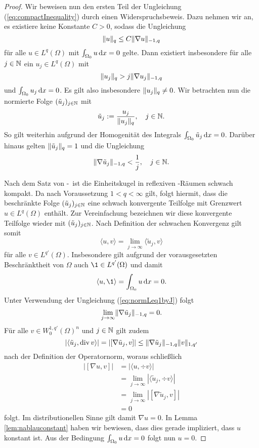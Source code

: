 \begin{proof}
  Wir beweisen nun den ersten Teil der Ungleichung (\ref{eq:compactInequality}) durch einen Widerspruchsbeweis.
  Dazu nehmen wir an, es existiere keine Konstante $C > 0$, sodass die Ungleichung
  $$
  \lVert u \rVert_q \leq C \lVert \nabla u \rVert_{-1,q}
  $$
  für alle $u \in L^q(\Omega)$ mit $\int_{\Omega_0} u \, {\operatorname{d}\!{x}} = 0$ gelte.
  Dann existiert insbesondere für alle $j \in \mathbb{N}$ ein $u_j \in L^q(\Omega)$ mit
  $$
  \lVert u_j \rVert_q > j \lVert \nabla u_j \rVert_{-1,q}
  $$
  und $\int_{\Omega_0} u_j \, {\operatorname{d}\!{x}} = 0$.
  Es gilt also insbesondere $\lVert u_j \rVert_q \neq 0$.
  Wir betrachten nun die normierte Folge $(\tilde u_j)_{j \in \mathbb{N}}$ mit 
  $$
  \tilde u_j := \frac{u_j}{\lVert u_j \rVert_{q}}, \quad j \in \mathbb{N}.
  $$
  So gilt weiterhin aufgrund der Homogenität des Integrals $\int_{\Omega_0} \tilde u_j \, {\operatorname{d}\!{x}} = 0$. 
  Darüber hinaus gelten $\lVert \tilde u_j \rVert_q = 1$ und die Ungleichung 
  \begin{equation}
    \label{eq:normLeq1byJ}
    \lVert \nabla \tilde u_j \rVert_{-1,q} < \frac{1}{j}, \quad j \in \mathbb{N}.
  \end{equation}

  Nach dem Satz von \banach\hyp{}\alaoglu\ ist die Einheitskugel in reflexiven \banach\hyp{}Räumen schwach kompakt.
  Da nach Voraussetzung $1 < q < \infty$ gilt, folgt hiermit, dass die beschränkte Folge $(\tilde u_j)_{j \in \mathbb{N}}$ eine schwach konvergente Teilfolge mit Grenzwert $u \in L^q(\Omega)$ enthält.
  Zur Vereinfachung bezeichnen wir diese konvergente Teilfolge wieder mit $(\tilde u_j)_{j \in \mathbb{N}}$.
  Nach Definition der schwachen Konvergenz gilt somit
  $$
  \langle u, v \rangle = \lim_{j \to \infty} \langle \tilde u_j, v \rangle
  $$
  für alle $v \in L^{q'}(\Omega)$.
  Insbesondere gilt aufgrund der vorausgesetzten Beschränktheit von $\Omega$ auch $\1 \in L^{q'}(\Omega)$ und damit
  $$
  \langle u, \1 \rangle = \int_{\Omega_0} u \d x = 0.
  $$
  Unter Verwendung der Ungleichung (\ref{eq:normLeq1byJ}) folgt
  \begin{equation}
    \label{eq:limNablaU}
    \lim_{j \to \infty} \lVert \nabla \tilde u_j \rVert_{-1,q} = 0. 
  \end{equation}
  Für alle $v \in W_0^{1,q'}(\Omega)^n$ und $j \in \mathbb{N}$ gilt zudem 
  $$ 
  |\langle \tilde u_j, \mathrm{div\,} v \rangle| = |[\nabla \tilde u_j, v]| \leq \lVert \nabla \tilde u_j \rVert_{-1,q} \lVert v \rVert_{1,q'}
  $$
  nach der Definition der Operatornorm, woraus schließlich
  \begin{align*}
    |[\nabla u, v]|
    &= |\langle u, \div v \rangle| \\
    &= \lim_{j \to \infty}|\langle \tilde u_j, \div v \rangle| \\
    &= \lim_{j \to \infty} |[\nabla \tilde u_j, v ]| \\
    &= 0
  \end{align*}
  folgt.
  Im distributionellen Sinne gilt damit $\nabla u = 0$.
  In Lemma \ref{lem:nablauconstant} haben wir bewiesen, dass dies gerade impliziert, dass $u$ konstant ist.
  Aus der Bedingung $\int_{\Omega_0} u \, {\operatorname{d}\!{x}} = 0$ folgt nun $u = 0$. 
  

\end{proof}
